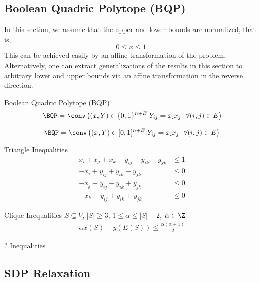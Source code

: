 \subsection{Boolean Quadric Polytope (BQP)}
In this section, we assume that the upper and lower bounds are normalized, that is, 
$$
0 \leq x \leq 1.
$$
This can be achieved easily by an affine transformation of the problem.  Alternatively, one can extract generalizations of the results in this section to arbitrary lower and upper bounds via an affine transformation in the reverse direction.

\begin{general}{Boolean Quadric Polytope (BQP)}{}
\begin{equation}
\BQP = \conv\left( (x,Y) \in \{0,1\}^{n+ E} | Y_{ij} = x_i x_j \ \ \forall (i,j) \in E \right)
\end{equation}
\end{general}

\begin{theorem}
\begin{equation}
\BQP = \conv\left( (x,Y) \in [0,1]^{n+ E} | Y_{ij} = x_i x_j \ \ \forall (i,j) \in E \right)
\end{equation}
\end{theorem}


\cite{Akshay-Gupte2019}
\begin{general}{Triangle Inequalities}{}
\begin{align*}
x_i + x_j + x_k - y_{ij} - y_{ik} - y_{jk} & \leq 1\\
- x_i + y_{ij} + y_{ik} - y_{jk} &\leq 0\\
- x_j + y_{ij} - y_{ik} + y_{jk}& \leq 0\\
- x_k - y_{ij} + y_{ik} + y_{jk} &\leq 0
\end{align*}
\end{general}

\begin{general}{Clique Inequalities}{}
$S \subseteq V$, $|S| \geq 3$, $1 \leq \alpha \leq |S|-2$, $\alpha \in \Z$
\begin{align*}
\alpha x(S) - y(E(S)) \leq \frac{\alpha(\alpha+1)}{2}
\end{align*}
\end{general}

\begin{general}{? Inequalities}{}

\end{general}

\subsection{SDP Relaxation}



